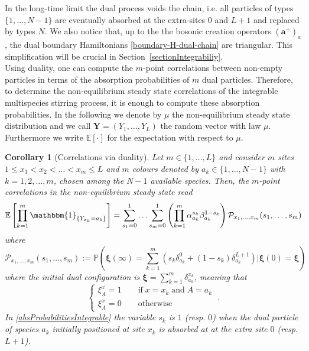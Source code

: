 \documentclass[10pt]{article}
\numberwithin{equation}{section}
\numberwithin{equation}{subsection}
\newtheorem{corollary}{Corollary}
\newcommand{\dt}{\;.}
\newcommand{\fra}[1]{\textcolor[rgb]{0,0,1}{#1}}
\begin{document}
In the long-time limit the dual process voids the chain, i.e. all particles of types $\{1,\ldots,N-1\}$ are eventually absorbed at the extra-sites $0$ and $L+1$ and replaced by types $N$. We also notice that, \fra{up to the the bosonic} creation operators $(\mathbf{a}^{+})_{a}$, the dual boundary Hamiltonians \eqref{boundary-H-dual-chain} are triangular. This simplification will be crucial in Section~\ref{sectionIntegrabiliy}.\\
Using duality, one can compute the  $m$-point correlations between non-empty particles in terms of the absorption probabilities of $m$ dual particles. Therefore, to determine the non-equilibrium steady state correlations of the integrable multispecies stirring process, it is enough to compute these absorption probabilities. In the following we denote by $\mu$ the non-equilibrium steady state distribution and we call $\bm{Y} = (Y_1,\ldots,Y_L)$ the random vector with law $\mu$. 
Furthermore we write $\mathbb{E}[\cdot]$ for the expectation with respect to $\mu$.
\begin{corollary}[Correlations via duality]\label{Corolollary-ABS_Corr-abstract}
Let $m\in \{1,\ldots,L\}$ and consider $m$ sites $1 \le x_{1} < x_2 < \ldots < x_m \le L $ and
{$m$ colours denoted by $a_{k}\in\{1,\ldots,N-1\}$  with $k=1,2,\ldots, m$, chosen among the $N-1$ available species.} Then, the $m$-point correlations in the non-equilibrium steady state read 
\begin{equation}\label{NESS-expectation-ABS}
\mathbb{E}\left[\prod_{k=1}^{m}\mathbbm{1}_{\{Y_{x_{k}}=a_{k}\}}\right]=\sum_{s_{1}=0}^{1}\ldots \sum_{s_{m}=0}^{1}\left(\prod_{k=1}^{m}\alpha_{a_{k}}^{s_{k}}\beta_{a_{k}}^{1-s_{k}}\right)\mathcal{P}_{x_1,\ldots,x_m}(s_{1},\ldots,s_{m})
\end{equation}
where
\begin{equation}\label{absProbabilitiesIntegrable}
	\mathcal{P}_{x_1,\ldots,x_m}(s_{1},\ldots,s_{m}):=\mathbb{P}\left(\bm{\xi}(\infty)=\sum_{k=1}^{m}\left(s_{k}\delta^{0}_{a_k}+(1-s_{k})\delta^{L+1}_{a_k}\right)\Big| \bm{\xi}(0)=\bm{\xi}\right)
\end{equation}
where the initial dual configuration is $\bm{\xi}=\sum_{k=1}^{m}\delta_{a_{k}}^{x_{k}}$, meaning that 
\begin{equation}
\label{xsi-init}
	\begin{cases}
		\xi_{A}^{x}=1\qquad \text{if}\;x=x_{k}\;\text{and}\; A=a_{k}\\
		\xi_{A}^{x}=0\qquad \text{otherwise}
	\end{cases}\dt
\end{equation}
In \eqref{absProbabilitiesIntegrable} the variable $s_k$ is $1$ (resp. $0$) when the dual particle of species $a_k$ initially positioned at site $x_{k}$ is absorbed at at the extra site $0$ (resp. $L+1$).
\end{corollary}
\end{document}
